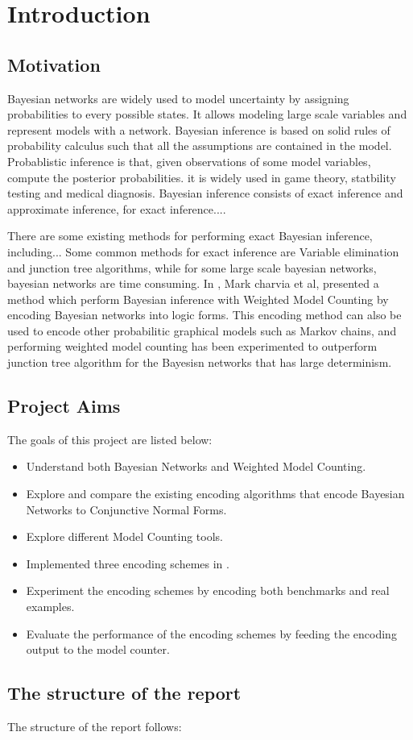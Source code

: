 
\section{Introduction}
    \subsection{Motivation}
    Bayesian networks are widely used to model uncertainty by assigning probabilities to every possible states. It allows modeling large scale variables and represent models with a network.
    Bayesian inference is based on solid rules of probability calculus such that all the assumptions are contained in the model.
    Probablistic inference is that, given observations of some model variables, compute the posterior probabilities. it is widely used in game theory, statbility testing and medical diagnosis. 
    Bayesian inference consists of exact inference and approximate inference, for exact inference....\par
    There are some existing methods for performing exact Bayesian inference, including...
    Some common methods for exact inference are Variable elimination and junction tree algorithms, while for some large scale bayesian networks, bayesian networks are time consuming. In \cite{enc1}, Mark charvia et al, presented a method which perform Bayesian inference with Weighted Model Counting by encoding Bayesian networks into logic forms. This encoding method can also be used to encode other probabilitic graphical models such as Markov chains, and performing weighted model counting has been experimented to outperform junction tree algorithm for the Bayesisn networks that has large determinism.\par
    
    \subsection{Project Aims}
    The goals of this project are listed below:
    \begin{itemize}
        \item Understand both Bayesian Networks and Weighted Model Counting.
        \item Explore and compare the existing encoding algorithms that encode Bayesian Networks to Conjunctive Normal Forms.
        \item Explore different Model Counting tools.
        \item Implemented three encoding schemes in \cite{enc1,enc2,2006-enc3}.
        \item Experiment the encoding schemes by encoding both benchmarks and real examples.
        \item Evaluate the performance of the encoding schemes by feeding the encoding output to the model counter.
    \end{itemize}

    \subsection{The structure of the report}
    The structure of the report follows:


\newpage